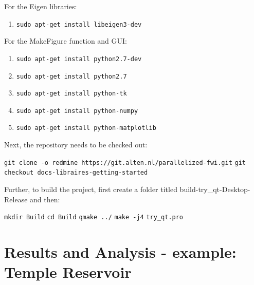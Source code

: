 \documentclass[10pt,a4paper]{article}
\begin{document}
For the Eigen libraries:
\begin{enumerate}
    \item \texttt{sudo apt-get install libeigen3-dev}
\end{enumerate}


For the MakeFigure function and GUI:

\begin{enumerate}
    \item \texttt{sudo apt-get install python2.7-dev}
    \item \texttt{sudo apt-get install python2.7}
    \item \texttt{sudo apt-get install python-tk}
    \item \texttt{sudo apt-get install python-numpy}
    \item \texttt{sudo apt-get install python-matplotlib}
\end{enumerate}

Next, the repository needs to be checked out:
\newline

\texttt{git clone -o redmine https://git.alten.nl/parallelized-fwi.git}
\newline
\texttt{git checkout docs-libraires-getting-started}
\newline

Further, to build the project, first create a folder titled
build-try\_qt-Desktop-Release and then:
\newline

\texttt{mkdir Build}
\newline
\texttt{cd Build}
\newline
\texttt{qmake ../}
\newline
\texttt{make -j4}
\newline
\texttt{try\_qt.pro}

\section{Results and Analysis - example: Temple Reservoir}
\end{document}
